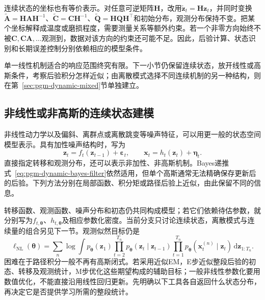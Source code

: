 连续状态的坐标也有等价表示。对任意可逆矩阵$\bm H$，改用$\widetilde{\bm z}_t=\bm H\bm z_t$，并同时变换$\widetilde{\bm A}=\bm H\bm A\bm H^{-1}$、$\widetilde{\bm C}=\bm C\bm H^{-1}$、$\widetilde{\bm Q}=\bm H\bm Q\bm H^\top$和初始分布，观测分布保持不变。把某个坐标解释成温度或磨损程度，需要测量关系等额外约束。若一个非零方向始终不被$\bm C,\bm C\bm A,\ldots$观测到，数据对该方向的约束还可能不足。因此，后验计算、状态识别和长期误差控制分别依赖相应的模型条件。

单一线性机制适合的响应范围终究有限。下一小节仍保留连续状态，放开线性或高斯条件，考察后验积分怎样近似；由离散模式选择不同连续机制的另一种结构，则在第~\ref{sec:pgm-dynamic-mixed}节单独建立。

\subsection{非线性或非高斯的连续状态建模}
\label{sec:pgm-dynamic-nonlinear-model}

非线性动力学以及偏斜、离群点或离散跳变等噪声特征，可以用更一般的状态空间模型表示。具有加性噪声结构时，写为
\begin{equation}
  \bm z_t=f_t(\bm z_{t-1})+\bm\varepsilon_t,\qquad
  \bm x_t=h_t(\bm z_t)+\bm\eta_t.
  \label{eq:pgm-dynamic-nonlinear}
\end{equation}
直接指定转移和观测分布，还可以表示非加性、非高斯机制。Bayes递推式~\eqref{eq:pgm-dynamic-bayes-filter}依然适用，但单个高斯通常无法精确保存更新后的后验。下列方法分别在局部函数、积分矩或路径后验上近似，由此保留不同的信息。

转移函数、观测函数、噪声分布和初态仍共同构成模型；若它们依赖待估参数，就分别写为$f_{t,\bm\theta}$、$h_{t,\bm\theta}$及相应参数化密度。当前分支只讨论连续状态，离散模式与连续量的组合另见下一节。观测似然目标仍是
\begin{equation}
  \ell_{\mathrm{NL}}(\bm\theta)
    =\sum_n\log\int p_{\bm\theta}(\bm z_1)
      \prod_{t=2}^{T_n}p_{\bm\theta}(\bm z_t\mid\bm z_{t-1})
      \prod_{t=1}^{T_n}p_{\bm\theta}(\bm x_t^{(n)}\mid\bm z_t)
      \,\mathrm d\bm z_{1:T_n}.
  \label{eq:pgm-dynamic-nonlinear-objective}
\end{equation}
困难在于路径积分一般不再有高斯闭式。若采用近似EM，E步近似整段后验的初态、转移及观测统计，M步优化这些期望构成的辅助目标；一般非线性参数化要用数值优化，不能直接沿用线性回归更新。先明确以下工具各自返回什么状态分布，再决定它是否提供学习所需的整段统计。

